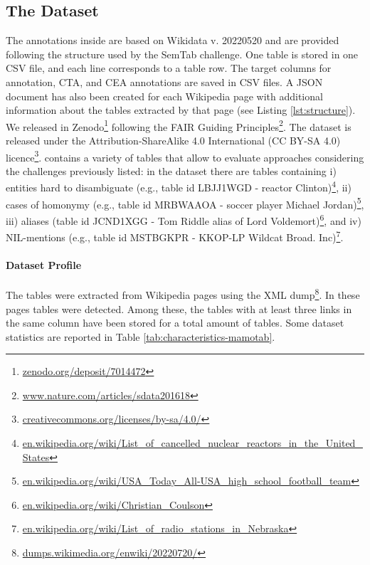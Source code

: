 \subsection{The \mammotab Dataset}
\label{sec:the-mammotab-dataset}

The annotations inside \mammotab are based on Wikidata v. 20220520 and are provided following the structure used by the SemTab challenge. One table is stored in one CSV file, and each line corresponds to a table row. The target columns for annotation, CTA, and CEA annotations are saved in CSV files. A JSON document has also been created for each Wikipedia page with additional information about the tables extracted by that page (see Listing \ref{lst:structure}). We released \mammotab in Zenodo\footnote{\href{https://zenodo.org/deposit/7014472}{zenodo.org/deposit/7014472}} following the FAIR Guiding Principles\footnote{\href{https://www.nature.com/articles/sdata201618}{www.nature.com/articles/sdata201618}}. The dataset is released under the Attribution-ShareAlike 4.0 International (CC BY-SA 4.0) licence\footnote{\href{https://creativecommons.org/licenses/by-sa/4.0/}{creativecommons.org/licenses/by-sa/4.0/}}.
\mammotab contains a variety of tables that allow to evaluate approaches considering the challenges previously listed: in the dataset there are tables containing i) entities hard to disambiguate (e.g., table id LBJJ1WGD - reactor Clinton)\footnote{\href{https://en.wikipedia.org/wiki/List_of_cancelled_nuclear_reactors_in_the_United_States}{en.wikipedia.org/wiki/List\_of\_cancelled\_nuclear\_reactors\_in\_the\_United\_States}}, ii) cases of homonymy (e.g., table id MRBWAAOA - soccer player Michael Jordan)\footnote{\href{https://en.wikipedia.org/wiki/USA_Today_All-USA_high_school_football_team}{en.wikipedia.org/wiki/USA\_Today\_All-USA\_high\_school\_football\_team}}, iii) aliases (table id JCND1XGG - Tom Riddle alias of Lord Voldemort)\footnote{\href{https://en.wikipedia.org/wiki/Christian_Coulson}{en.wikipedia.org/wiki/Christian\_Coulson}}, and iv) NIL-mentions (e.g., table id MSTBGKPR - KKOP-LP Wildcat Broad. Inc)\footnote{\href{https://en.wikipedia.org/wiki/List _of_radio_stations_in_Nebraska}{en.wikipedia.org/wiki/List\_of\_radio\_stations\_in\_Nebraska}}.

\paragraph{Dataset Profile}
\label{sec:dataset-profile}

The \mammotab tables were extracted from  Wikipedia pages using the XML dump\footnote{\href{https://dumps.wikimedia.org/enwiki/20220720/}{dumps.wikimedia.org/enwiki/20220720/}}. In these pages  tables were detected. Among these, the tables with at least three links in the same column have been stored for a total amount of  tables. Some dataset statistics are reported in Table \ref{tab:characteristics-mamotab}.


